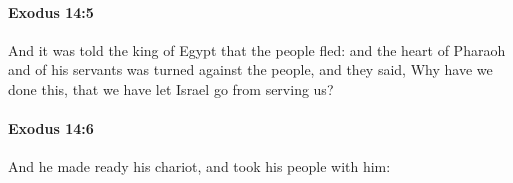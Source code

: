 		\paragraph{Exodus 14:5} %
			\label{EXODUS-14-5}

			And it was told the king of Egypt that the people fled: and the heart of Pharaoh and of his servants was turned against the people, and they said, Why have we done this, that we have let Israel go from serving us?


		\paragraph{Exodus 14:6} %
			\label{EXODUS-14-6}

			And he made ready his chariot, and took his people with him:


